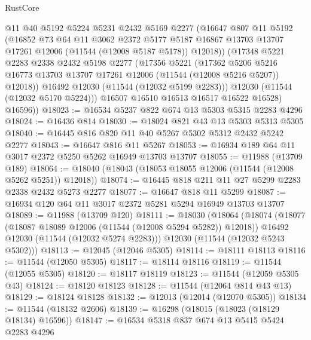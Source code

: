 \begin{lexlean}{RustCore}
\begin{coremodule}
            @11
            @40
            @5192
            @5224
            @5231
            @2432
            @5169
            @2277
            (@16647
              @807
              @11
              @5192
              (@16852
                @73
                @64
                @11
                @3062
                @2372
                @5177
                @5187
                @16867
                @13703
                @13707
                @17261
                @12006
                (@11544 (@12008 @5187 @5178))
                @12018))
            (@17348
              @5221
              @2283
              @2338
              @2432
              @5198
              @2277
              (@17356
                @5221
                (@17362
                  @5206
                  @5216
                  @16773
                  @13703
                  @13707
                  @17261
                  @12006
                  (@11544 (@12008 @5216 @5207))
                  @12018))
              @16492
              @12030
              (@11544 (@12032 @5199 @2283)))
            @12030
            (@11544 (@12032 @5170 @5224)))
          @16507
          @16510
          @16513
          @16517
          @16522
          @16528)
        @16596))
@18023 := @16534 @5237 @822 @674 @13 @5303 @5315 @2283 @4296
@18024 := @16436 @814
@18030 := @18024 @821 @43 @13 @5303 @5313 @5305
@18040 := @16445 @816 @820 @11 @40 @5267 @5302 @5312 @2432 @5242 @2277
@18043 := @16647 @816 @11 @5267
@18053 := @16934 @189 @64 @11 @3017 @2372 @5250 @5262 @16949 @13703 @13707
@18055 := @11988 (@13709 @189)
@18064 := @18040 (@18043 (@18053 @18055 @12006 (@11544 (@12008 @5262 @5251)) @12018))
@18074 := @16445 @818 @211 @11 @27 @5299 @2283 @2338 @2432 @5273 @2277
@18077 := @16647 @818 @11 @5299
@18087 := @16934 @120 @64 @11 @3017 @2372 @5281 @5294 @16949 @13703 @13707
@18089 := @11988 (@13709 @120)
@18111 := @18030
    (@18064
      (@18074
        (@18077 (@18087 @18089 @12006 (@11544 (@12008 @5294 @5282)) @12018))
        @16492
        @12030
        (@11544 (@12032 @5274 @2283)))
      @12030
      (@11544 (@12032 @5243 @5302)))
@18113 := @12045 (@12046 @5305)
@18114 := @18111 @18113
@18116 := @11544 (@12050 @5305)
@18117 := @18114 @18116
@18119 := @11544 (@12055 @5305)
@18120 := @18117 @18119
@18123 := @11544 (@12059 @5305 @43)
@18124 := @18120 @18123
@18128 := @11544 (@12064 @814 @43 @13)
@18129 := @18124 @18128
@18132 := @12013 (@12014 (@12070 @5305))
@18134 := @11544 (@18132 @2606)
@18139 := @16298 (@18015 (@18023 (@18129 @18134) @16596))
@18147 := @16534 @5318 @837 @674 @13 @5415 @5424 @2283 @4296

\end{coremodule}
\end{lexlean}
